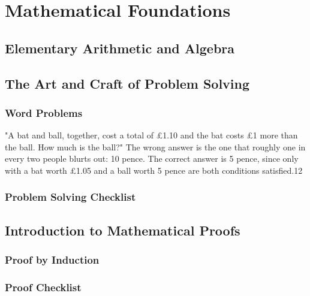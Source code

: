 \chapter{Mathematical Foundations}
\section{Elementary Arithmetic and Algebra}
\section{The Art and Craft of Problem Solving}
\subsection{Word Problems}
"A bat and ball, together, cost a total of £1.10 and the bat costs £1 more than the ball. How much is the ball?" The wrong answer
is the one that roughly one in every two people blurts out: 10 pence. The correct answer is 5 pence, since only with a bat worth
£1.05 and a ball worth 5 pence are both conditions satisfied.12

\subsection{Problem Solving Checklist}
\section{Introduction to Mathematical Proofs}
\subsection{Proof by Induction}
\subsection{Proof Checklist}
